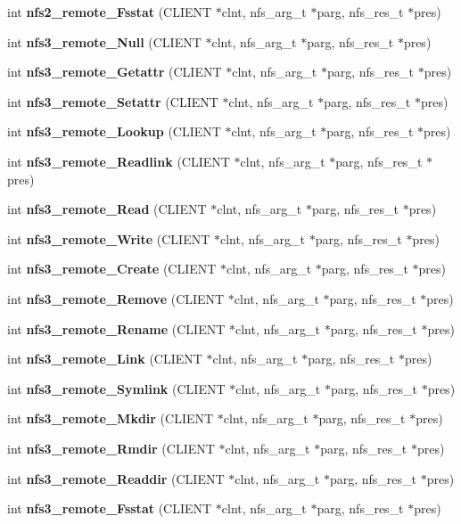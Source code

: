 \begin{CompactItemize}
\item 
int {\bf nfs2\_\-remote\_\-Fsstat} (CLIENT $\ast$clnt, nfs\_\-arg\_\-t $\ast$parg, nfs\_\-res\_\-t $\ast$pres)
\item 
int {\bf nfs3\_\-remote\_\-Null} (CLIENT $\ast$clnt, nfs\_\-arg\_\-t $\ast$parg, nfs\_\-res\_\-t $\ast$pres)
\item 
int {\bf nfs3\_\-remote\_\-Getattr} (CLIENT $\ast$clnt, nfs\_\-arg\_\-t $\ast$parg, nfs\_\-res\_\-t $\ast$pres)
\item 
int {\bf nfs3\_\-remote\_\-Setattr} (CLIENT $\ast$clnt, nfs\_\-arg\_\-t $\ast$parg, nfs\_\-res\_\-t $\ast$pres)
\item 
int {\bf nfs3\_\-remote\_\-Lookup} (CLIENT $\ast$clnt, nfs\_\-arg\_\-t $\ast$parg, nfs\_\-res\_\-t $\ast$pres)
\item 
int {\bf nfs3\_\-remote\_\-Readlink} (CLIENT $\ast$clnt, nfs\_\-arg\_\-t $\ast$parg, nfs\_\-res\_\-t $\ast$pres)
\item 
int {\bf nfs3\_\-remote\_\-Read} (CLIENT $\ast$clnt, nfs\_\-arg\_\-t $\ast$parg, nfs\_\-res\_\-t $\ast$pres)
\item 
int {\bf nfs3\_\-remote\_\-Write} (CLIENT $\ast$clnt, nfs\_\-arg\_\-t $\ast$parg, nfs\_\-res\_\-t $\ast$pres)
\item 
int {\bf nfs3\_\-remote\_\-Create} (CLIENT $\ast$clnt, nfs\_\-arg\_\-t $\ast$parg, nfs\_\-res\_\-t $\ast$pres)
\item 
int {\bf nfs3\_\-remote\_\-Remove} (CLIENT $\ast$clnt, nfs\_\-arg\_\-t $\ast$parg, nfs\_\-res\_\-t $\ast$pres)
\item 
int {\bf nfs3\_\-remote\_\-Rename} (CLIENT $\ast$clnt, nfs\_\-arg\_\-t $\ast$parg, nfs\_\-res\_\-t $\ast$pres)
\item 
int {\bf nfs3\_\-remote\_\-Link} (CLIENT $\ast$clnt, nfs\_\-arg\_\-t $\ast$parg, nfs\_\-res\_\-t $\ast$pres)
\item 
int {\bf nfs3\_\-remote\_\-Symlink} (CLIENT $\ast$clnt, nfs\_\-arg\_\-t $\ast$parg, nfs\_\-res\_\-t $\ast$pres)
\item 
int {\bf nfs3\_\-remote\_\-Mkdir} (CLIENT $\ast$clnt, nfs\_\-arg\_\-t $\ast$parg, nfs\_\-res\_\-t $\ast$pres)
\item 
int {\bf nfs3\_\-remote\_\-Rmdir} (CLIENT $\ast$clnt, nfs\_\-arg\_\-t $\ast$parg, nfs\_\-res\_\-t $\ast$pres)
\item 
int {\bf nfs3\_\-remote\_\-Readdir} (CLIENT $\ast$clnt, nfs\_\-arg\_\-t $\ast$parg, nfs\_\-res\_\-t $\ast$pres)
\item 
int {\bf nfs3\_\-remote\_\-Fsstat} (CLIENT $\ast$clnt, nfs\_\-arg\_\-t $\ast$parg, nfs\_\-res\_\-t $\ast$pres)

\end{CompactItemize}
